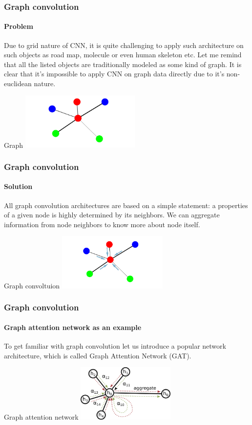 \documentclass[10pt]{beamer}
\begin{document}
\begin{frame}
    \frametitle{Graph convolution}
    \framesubtitle{Problem}
    Due to grid nature of CNN, it is quite challenging to apply such architecture on such objects as road map, molecule or even human skeleton etc. Let me remind that all the listed objects are traditionally modeled as some kind of graph. It is clear that it's impossible to apply CNN on graph data directly due to it's non-euclidean nature.
    \begin{block}{Graph}
        \centering
        \includegraphics[height=80pt]{figure/graph.png}
    \end{block}
\end{frame}

\begin{frame}
    \frametitle{Graph convolution}
    \framesubtitle{Solution}
    All graph convolution architectures are based on a simple statement: a properties of a given node is highly determined by its neighbors. We can aggregate information from node neighbors to know more about node itself.
    \begin{block}{Graph convoltuion}
        \centering
        \includegraphics[height=80pt]{figure/graph-spatial-convolution.png}
    \end{block}
\end{frame}

\begin{frame}
    \frametitle{Graph convolution}
    \framesubtitle{Graph attention network as an example}
    To get familiar with graph convolution let us introduce a popular network architecture, which is called Graph Attention Network (GAT).
    \begin{block}{Graph attention network}
        \centering
        \includegraphics[height=80pt]{figure/attention.png}
    \end{block}
\end{frame}
\end{document}
